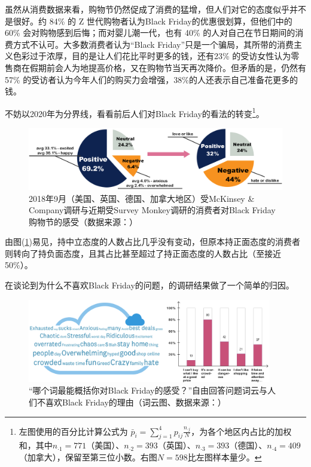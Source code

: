 \documentclass[12pt]{ctexart}
\begin{document}
虽然从消费数据来看，购物节仍然促成了消费的猛增，但人们对它的态度似乎并不是很好。约 84\% 的 Z 世代购物者认为Black Friday的优惠很划算，但他们中的 60\% 会对购物感到后悔；而对婴儿潮一代，也有 40\% 的人对自己在节日期间的消费方式不认可。大多数消费者认为“Black Friday”只是一个骗局，其所带的消费主义色彩过于浓厚，目的是让人们花比平时更多的钱，还有23\% 的受访女性认为零售商在假期前会人为地提高价格，又在购物节当天再次降价。但矛盾的是，仍然有57\% 的受访者认为今年人们的购买力会增强，38\%的人还表示自己准备花更多的钱。

不妨以2020年为分界线，看看前后人们对Black Friday的看法的转变\footnote{左图使用的百分比计算公式为 $\bar{p}_i=\sum_{j=1}^{4}p_{ij}\frac{n_{\cdot j}}{N}$，为各个地区内占比的加权和，其中$n_{\cdot 1}=771$（美国）、$n_{\cdot 2}=393$（英国）、$n_{\cdot 3}=393$（德国）、$n_{\cdot 4}=409$（加拿大），保留至第三位小数。右图$N=598$比左图样本量少。}。

\begin{figure}[htbp!]
    \centering
    \includegraphics[width=1\textwidth]{Images/4.png}
    \caption{2018年9月（美国、英国、德国、加拿大地区）受McKinsey \& Company调研与近期受Survey Monkey调研的消费者对Black Friday购物节的感受（数据来源：\cite{6,7}）}
    \label{pnn}
\end{figure}

由图(\ref{pnn})易见，持中立态度的人数占比几乎没有变动，但原本持正面态度的消费者则转向了持负面态度，且其占比甚至超过了持正面态度的人数占比（至接近50\%）。

在谈论到为什么不喜欢Black Friday的问题，\cite{6}的调研结果做了一个简单的归因。

\begin{figure}[htbp!]
    \centering
    \includegraphics[width=0.95\textwidth]{Images/5.png}
    \caption{“哪个词最能概括你对Black Friday的感受？”自由回答问题词云与人们不喜欢Black Friday的理由（词云图、数据来源：\cite{6}）}
\end{figure}
\end{document}
